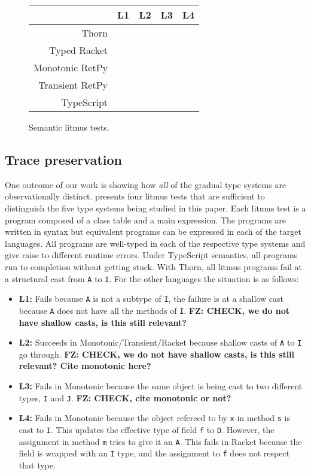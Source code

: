 \documentclass[acmlarge, anonymous, authordraft]{acmart}
\newcommand{\code}[1]{{\tt #1}\xspace}
\newcommand{\FZ}[1]{\textbf{FZ: #1}}
\begin{document}
\begin{figure}[!t]
\center

\begin{tabular}{|r|l@{~}l@{~}l@{~}l|}\hline
                     & L1 & L2 & L3 & L4\\\hline\rowcolor{Gray}
Thorn                &    &    &    &   \\
Typed Racket         &    & \V & \V &  \\\rowcolor{Gray}
Monotonic  RetPy     &    & \V &    &   \\
Transient RetPy      &    & \V & \V & \V \\\rowcolor{Gray}
TypeScript           & \V & \V & \V & \V \\\hline
\end{tabular}  
  \caption{Semantic litmus tests.}\label{litmus}
\end{figure}


\subsection{Trace preservation}

One outcome of our work is showing how \emph{all} of the gradual type systems
are observationally distinct.   presents four litmus tests that
are sufficient to distinguish the five type systems being studied in this
paper.  Each litmus test is a program composed of a class table and a main
expression. The programs are written in \kafka syntax but equivalent
programs can be expressed in each of the target languages. All programs are
well-typed in each of the respective type systems and give raise to
different runtime errors. Under TypeScript semantics, all programs run to
completion without getting stuck. With Thorn, all litmus programs fail at a structural cast from \code A to \code I.  For the other languages the situation is
as follows:
\begin{itemize}
\item {\bf L1:} Fails because \code A is not a subtype of \code I, the
  failure is at a shallow cast because \code A does not have all the methods of
  \code I.   \FZ{CHECK, we do not have shallow casts, is this still relevant?}
\item{\bf L2:} Succeeds in Monotonic/Transient/Racket because shallow casts
  of \code A to \code I go through. \FZ{CHECK, we do not have shallow casts, is this still relevant?  Cite monotonic here?}
\item{\bf L3:} Fails in Monotonic because the same object is being cast to
  two different types, \code I and \code J.  \FZ{CHECK, cite monotonic or not?}
\item{\bf L4:} Fails in Monotonic because the object refereed to by \code x
  in method \code s is cast to \code I. This updates the effective type of field
  \code f to \code D. However, the assignment in method \code m tries to give it
  an \code A. This fails in Racket because the \this field is wrapped with an
  \code I type, and the assignment to \code f does not respect that type.
\end{itemize}
\end{document}
